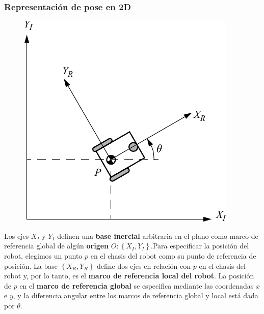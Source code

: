 \begin{frame}
    \frametitle{Representación de pose en 2D}
    \footnotesize

    \begin{figure}
        \includegraphics[width=0.3\columnwidth]{./images/coordinate_systems.pdf}
    \end{figure}



    Los ejes $X_I$ y $Y_I$ definen una {\bf base inercial} arbitraria en el plano como marco de referencia global de algún {\bf origen} $O:\left\lbrace X_I,Y_I \right\rbrace$.Para especificar la posición del robot, elegimos un punto $p$ en el chasis del robot como su punto de referencia de posición. La base $\left\lbrace X_R,Y_R \right\rbrace$ define dos ejes en relación con $p$ en el chasis del robot y, por lo tanto, es el {\bf marco de referencia local del robot}. La posición de $p$ en el {\bf marco de referencia global} se especifica mediante las coordenadas $x$ e $y$, y la diferencia angular entre los marcos de referencia global y local está dada por $\theta$.

\end{frame}


